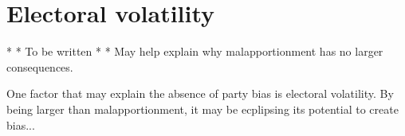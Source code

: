\documentclass[letter,12pt]{article}
\begin{document}




\section{Electoral volatility}

* * To be written * * May help explain why malapportionment has no larger consequences. 

One factor that may explain the absence of party bias is electoral volatility. By being larger than malapportionment, it may be ecplipsing its potential to create bias...
\end{document}
